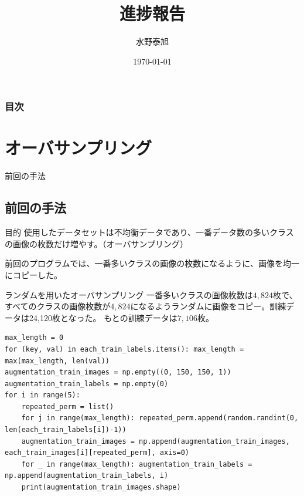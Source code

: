 \documentclass[leno,xcolor=dvipsnames]{beamer}
\title{進捗報告}
\date{\today}
\author{水野泰旭}
\institute{弘前大学理工学部電子情報工学科4年}
\begin{document}
  \maketitle
  \begin{frame}
    \frametitle{目次}
    \tableofcontents
  \end{frame}
  \section{オーバサンプリング}
  \begin{frame}{前回の手法}
    \subsection{前回の手法}
    \begin{block}{目的}
      使用したデータセットは不均衡データであり、一番データ数の多いクラスの画像の枚数だけ増やす。（オーバサンプリング）
    \end{block}
    前回のプログラムでは、一番多いクラスの画像の枚数になるように、画像を均一にコピーした。
  \end{frame}
  \begin{frame}[fragile]{ランダムを用いたオーバサンプリング}
    一番多いクラスの画像枚数は$4,824$枚で、すべてのクラスの画像枚数が$4,824$になるようランダムに画像をコピー。訓練データは24,120枚となった。
    もとの訓練データは$7,106$枚。
    \begin{lstlisting}[caption=\href{https://github.com/yasuak1/DeepImFam/blob/master/source/train_img/prc/train_deepimfam_augmentation.py}{rand\_augmentation.py}]
max_length = 0
for (key, val) in each_train_labels.items(): max_length = max(max_length, len(val))
augmentation_train_images = np.empty((0, 150, 150, 1))
augmentation_train_labels = np.empty(0)
for i in range(5):
    repeated_perm = list()
    for j in range(max_length): repeated_perm.append(random.randint(0, len(each_train_labels[i])-1))
    augmentation_train_images = np.append(augmentation_train_images, each_train_images[i][repeated_perm], axis=0)
    for _ in range(max_length): augmentation_train_labels = np.append(augmentation_train_labels, i)
    print(augmentation_train_images.shape)
    \end{lstlisting}
  \end{frame}
\end{document}
